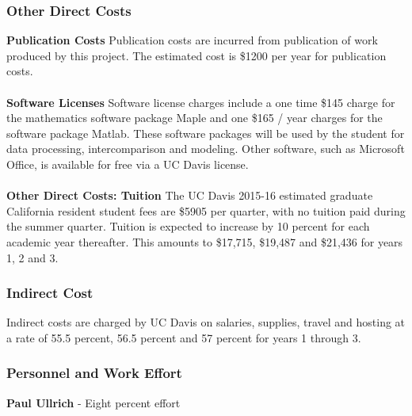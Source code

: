 \documentclass[11pt]{article}
\begin{document}
\subsubsection{Other Direct Costs}
\textbf{Publication Costs}
Publication costs are incurred from publication of work produced by this project. The estimated cost is \$1200 per year for publication costs.
\\\\
\textbf{Software  Licenses}
Software license charges include a one time \$145 charge for the mathematics software package Maple and one \$165 / year charges for the software package Matlab. These software packages will be used by the student for data processing, intercomparison and modeling. Other software, such as Microsoft Office, is available for free via a UC Davis license.
\\\\
\textbf{Other Direct Costs:  Tuition}
The UC Davis 2015-16 estimated graduate California resident student fees are \$5905 per quarter, with no tuition paid during the summer quarter. Tuition is expected to increase by 10 percent for each academic year thereafter. This amounts to \$17,715, \$19,487 and \$21,436 for years 1, 2 and 3.

\subsubsection{Indirect Cost}
Indirect costs are charged by UC Davis on salaries, supplies, travel and hosting at a rate of 55.5 percent, 56.5 percent and 57 percent for years 1 through 3.

\subsubsection{Personnel and Work Effort}
\textbf{Paul Ullrich} - Eight percent effort
\end{document}
